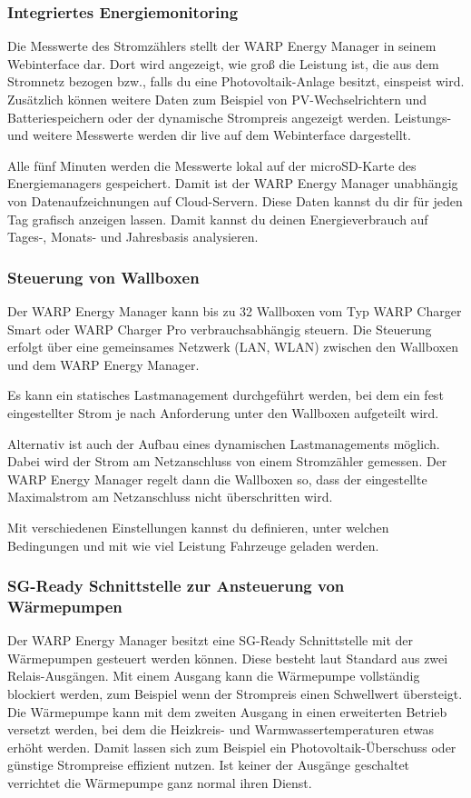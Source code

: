 \documentclass[a4paper,10pt]{article}
\begin{document}
\begin{multicols*}{2}
	\subsubsection{Integriertes Energiemonitoring}
	Die Messwerte des Stromzählers stellt der WARP Energy Manager in seinem
	Webinterface dar. Dort wird angezeigt, wie groß die Leistung ist, die aus dem Stromnetz
	bezogen bzw., falls du eine Photovoltaik-Anlage besitzt, einspeist wird. Zusätzlich können
    weitere Daten zum Beispiel von PV-Wechselrichtern und Batteriespeichern oder der dynamische Strompreis
    angezeigt werden. Leistungs- und weitere Messwerte werden dir live auf dem Webinterface dargestellt.

	Alle fünf Minuten werden die Messwerte lokal auf der microSD-Karte des
	Energiemanagers gespeichert. Damit ist der WARP Energy Manager unabhängig
	von Datenaufzeichnungen auf Cloud-Servern. Diese Daten kannst du dir für jeden Tag
	grafisch anzeigen lassen. Damit kannst du deinen Energieverbrauch auf Tages-, Monats- und
	Jahresbasis analysieren.

	\subsubsection{Steuerung von Wallboxen}
	Der WARP Energy Manager kann bis zu 32 Wallboxen vom Typ WARP Charger Smart oder WARP Charger Pro verbrauchsabhängig steuern.
	Die Steuerung erfolgt über eine gemeinsames Netzwerk (LAN, WLAN) zwischen den Wallboxen und dem WARP Energy Manager.

    Es kann ein statisches Lastmanagement durchgeführt werden, bei dem ein fest eingestellter Strom je nach Anforderung
    unter den Wallboxen aufgeteilt wird. 
    
    Alternativ ist auch der Aufbau eines dynamischen Lastmanagements möglich. Dabei wird der Strom am Netzanschluss
    von einem Stromzähler gemessen. Der WARP Energy Manager regelt dann die Wallboxen so, dass der eingestellte Maximalstrom 
    am Netzanschluss nicht überschritten wird.

	Mit verschiedenen Einstellungen kannst du definieren, 
	unter welchen Bedingungen und mit wie viel Leistung Fahrzeuge geladen werden.

	\subsubsection{SG-Ready Schnittstelle zur Ansteuerung von Wärmepumpen}
    Der WARP Energy Manager besitzt eine SG-Ready Schnittstelle mit der Wärmepumpen gesteuert werden können.
    Diese besteht laut Standard aus zwei Relais-Ausgängen. Mit einem Ausgang kann die Wärmepumpe vollständig blockiert werden, 
    zum Beispiel wenn der Strompreis einen Schwellwert übersteigt. Die Wärmepumpe kann mit dem zweiten
    Ausgang in einen erweiterten Betrieb versetzt werden, bei dem die Heizkreis- und Warmwassertemperaturen etwas erhöht werden. 
    Damit lassen sich zum Beispiel ein Photovoltaik-Überschuss oder günstige Strompreise effizient nutzen. Ist keiner
    der Ausgänge geschaltet verrichtet die Wärmepumpe ganz normal ihren Dienst.


\end{multicols*}
\end{document}
